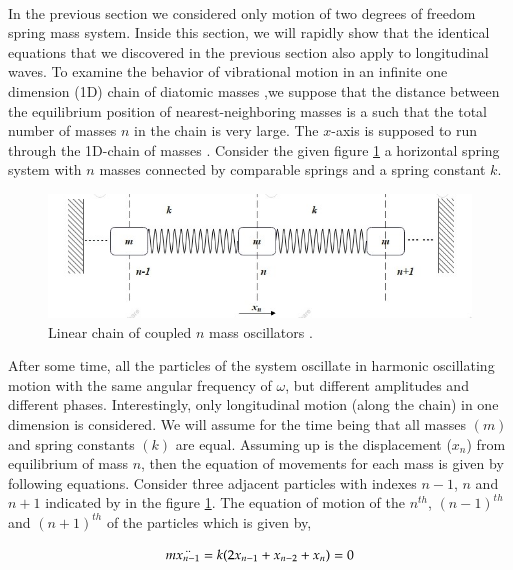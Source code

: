 \paragraph{}
In the previous section we considered only motion of two degrees of freedom spring mass system. Inside this section, we will rapidly show that the identical equations that we discovered in the previous section also apply to longitudinal waves. To examine the behavior of vibrational motion in an infinite one dimension (1D) chain of diatomic masses \cite{chen2020active},we suppose that the distance between the equilibrium position of nearest-neighboring masses is a such that the total number of masses $n$ in the chain is very large. The $x$-axis is supposed to run through the 1D-chain of masses \cite{lucovsky1970extension}. Consider the given figure \ref{fig:N} a horizontal spring system with $n$ masses connected by comparable springs and a spring constant $k$. 

 \begin{figure}[hbt!]
	\centering
	\begin{framed}
	\includegraphics[width=1\textwidth]{Figures/N.jpg}
		\end{framed}
	\caption{ Linear chain of coupled $n$ mass oscillators .}
	\label{fig:N}
\end{figure}

After some time, all the particles of the system oscillate in harmonic oscillating motion with the same angular frequency of $\omega$, but different amplitudes and different
phases. Interestingly, only longitudinal motion (along the chain) in one dimension is considered. We will assume for the time being that all masses $(m)$ and spring constants $(k)$ are equal. Assuming up is the displacement ($x_n$) from equilibrium of mass $n$, then the equation of movements for each mass is given by following equations. 
Consider three adjacent particles with indexes $n - 1$, $n$ and $n + 1$ indicated by in the figure \ref{fig:N}. The equation of motion of the $n^{th}$, $(n-1)^{th}$ and $(n+1)^{th}$  of the particles which is given by,  

\begin{equation}
    m\Ddot{x_{n-1}} = k(2x_{n-1}+x_{n-2} + x_{n} )=0
\end{equation}

